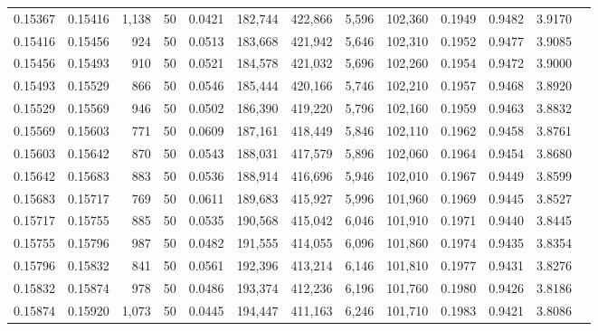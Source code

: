 \begin{tabular}{rrrrrrrrrrrrr}
0.15367 & 0.15416 & 1,138 &  50 &                                     0.0421 & 182,744 & 422,866 &   5,596 & 102,360 & 0.1949 & 0.9482 & 3.9170 \\
0.15416 & 0.15456 &   924 &  50 &                                     0.0513 & 183,668 & 421,942 &   5,646 & 102,310 & 0.1952 & 0.9477 & 3.9085 \\
0.15456 & 0.15493 &   910 &  50 &                                     0.0521 & 184,578 & 421,032 &   5,696 & 102,260 & 0.1954 & 0.9472 & 3.9000 \\
0.15493 & 0.15529 &   866 &  50 &                                     0.0546 & 185,444 & 420,166 &   5,746 & 102,210 & 0.1957 & 0.9468 & 3.8920 \\
0.15529 & 0.15569 &   946 &  50 &                                     0.0502 & 186,390 & 419,220 &   5,796 & 102,160 & 0.1959 & 0.9463 & 3.8832 \\
0.15569 & 0.15603 &   771 &  50 &                                     0.0609 & 187,161 & 418,449 &   5,846 & 102,110 & 0.1962 & 0.9458 & 3.8761 \\
0.15603 & 0.15642 &   870 &  50 &                                     0.0543 & 188,031 & 417,579 &   5,896 & 102,060 & 0.1964 & 0.9454 & 3.8680 \\
0.15642 & 0.15683 &   883 &  50 &                                     0.0536 & 188,914 & 416,696 &   5,946 & 102,010 & 0.1967 & 0.9449 & 3.8599 \\
0.15683 & 0.15717 &   769 &  50 &                                     0.0611 & 189,683 & 415,927 &   5,996 & 101,960 & 0.1969 & 0.9445 & 3.8527 \\
0.15717 & 0.15755 &   885 &  50 &                                     0.0535 & 190,568 & 415,042 &   6,046 & 101,910 & 0.1971 & 0.9440 & 3.8445 \\
0.15755 & 0.15796 &   987 &  50 &                                     0.0482 & 191,555 & 414,055 &   6,096 & 101,860 & 0.1974 & 0.9435 & 3.8354 \\
0.15796 & 0.15832 &   841 &  50 &                                     0.0561 & 192,396 & 413,214 &   6,146 & 101,810 & 0.1977 & 0.9431 & 3.8276 \\
0.15832 & 0.15874 &   978 &  50 &                                     0.0486 & 193,374 & 412,236 &   6,196 & 101,760 & 0.1980 & 0.9426 & 3.8186 \\
0.15874 & 0.15920 & 1,073 &  50 &                                     0.0445 & 194,447 & 411,163 &   6,246 & 101,710 & 0.1983 & 0.9421 & 3.8086 \\

\end{tabular}
